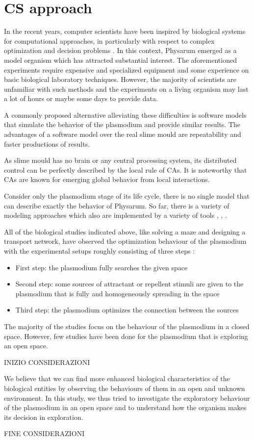 \section{CS approach}
In the recent years, computer scientists have been inspired by biological systems for computational approaches, in particularly with respect to complex optimization and decision problems \cite{grube2016physarum}. In this context, Physarum emerged as a model organism which has attracted substantial interest. The aforementioned experiments require expensive and specialized equipment and some experience on basic biological laboratory techniques. However, the majority of scientists are unfamiliar with such methods and the experiments on a living organism may last a lot of hours or maybe some days to provide data.
\par
A commonly proposed alternative alleviating these difficulties is software models that simulate the behavior of the plasmodium and provide similar results. The advantages of a software model over the real slime mould are repeatability and faster productions of results.
\par
As slime mould has no brain or any central processing system, its distributed control can be perfectly described by the local rule of CAs. It is noteworthy that CAs are known for emerging global behavior from local interactions. 
\par
Consider only the plasmodium stage of its life cycle, there is no single model that can describe exactly the behavior of Physarum. So far, there is a variety of modeling approaches which also are implemented by a variety of tools \cite{Tsompanas2016}, \cite{gunji2008minimal}, \cite{shirakawa2015construction}.
\par
All of the biological studies indicated above, like solving a maze and designing a transport network, have observed the optimization behaviour of the plasmodium with the experimental setups roughly consisting of three steps \cite{shirakawa2015construction}:
\begin{itemize}
	\item First step: the plasmodium fully searches the given space
	\item Second step: some sources of attractant or repellent stimuli are given to the plasmodium that is fully and homogeneously spreading in the space
	\item Third step: the plasmodium optimizes the connection between the sources
\end{itemize}

The majority of the studies focus on the behaviour of the plasmodium in a closed space. However, few studies have been done for the plasmodium that is exploring an open space. 
\par
INIZIO CONSIDERAZIONI
\par
We believe that we can find more enhanced biological characteristics of the biological entities by observing the behaviours of them in an open and unknown environment. In this study, we thus tried to investigate the exploratory behaviour of the plasmodium in an open space and to understand how the organism makes its decision in exploration. 
\par
FINE CONSIDERAZIONI


